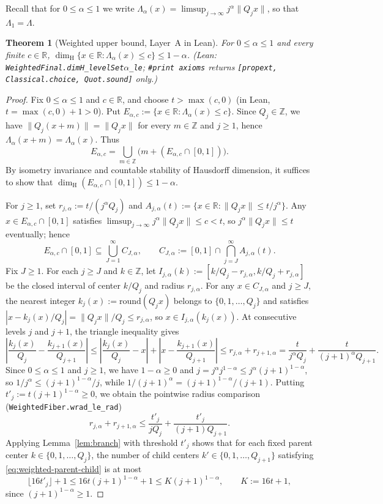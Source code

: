 \documentclass[11pt]{article}
\newtheorem{theorem}{Theorem}
\theoremstyle{definition}
\theoremstyle{remark}
\newcommand{\R}{\mathbb{R}}
\newcommand{\Z}{\mathbb{Z}}
\newcommand{\dimH}{\dim_{\mathrm{H}}}
\newcommand{\Lam}{\Lambda}
\begin{document}
Recall that for $0\le\alpha\le1$ we write
$\Lam_\alpha(x)=\limsup_{j\to\infty}j^\alpha\|Q_jx\|$, so that $\Lam_1=\Lam$.

\begin{theorem}[Weighted upper bound, Layer~A in Lean]\label{thm:upper}
For $0\le\alpha\le1$ and every finite $c\in\R$,
$\dimH\{x\in\R:\Lam_\alpha(x)\le c\}\le1-\alpha$.
(Lean: \texttt{WeightedFinal.\allowbreak dimH\_levelSet\ensuremath{\alpha}\_le};
\texttt{\#print axioms} returns \texttt{[propext, Classical.choice, Quot.sound]} only.)
\end{theorem}

\begin{proof}
Fix $0\le\alpha\le1$ and $c\in\R$, and choose $t>\max(c,0)$ (in Lean,
$t=\max(c,0)+1>0$). Put $E_{\alpha,c}:=\{x\in\R:\Lam_\alpha(x)\le c\}$. Since
$Q_j\in\Z$, we have $\|Q_j(x+m)\|=\|Q_jx\|$ for every $m\in\Z$ and $j\ge1$,
hence $\Lam_\alpha(x+m)=\Lam_\alpha(x)$. Thus
\[
E_{\alpha,c}=\bigcup_{m\in\Z}\bigl(m+(E_{\alpha,c}\cap[0,1])\bigr).
\]
By isometry invariance and countable stability of Hausdorff dimension, it
suffices to show that $\dimH(E_{\alpha,c}\cap[0,1])\le1-\alpha$.

For $j\ge1$, set $r_{j,\alpha}:=t/(j^\alpha Q_j)$ and
$A_{j,\alpha}(t):=\{x\in\R:\|Q_jx\|\le t/j^\alpha\}$. Any $x\in E_{\alpha,c}\cap[0,1]$
satisfies $\limsup_{j\to\infty}j^\alpha\|Q_jx\|\le c<t$, so $j^\alpha\|Q_jx\|\le t$
eventually; hence
\[
E_{\alpha,c}\cap[0,1]\subseteq\bigcup_{J=1}^\infty C_{J,\alpha},\qquad
C_{J,\alpha}:=[0,1]\cap\bigcap_{j=J}^\infty A_{j,\alpha}(t).
\]
Fix $J\ge1$. For each $j\ge J$ and $k\in\Z$, let
$I_{j,\alpha}(k):=[k/Q_j-r_{j,\alpha},k/Q_j+r_{j,\alpha}]$ be the closed
interval of center $k/Q_j$ and radius $r_{j,\alpha}$. For any $x\in C_{J,\alpha}$
and $j\ge J$, the nearest integer $k_j(x):=\mathrm{round}(Q_jx)$ belongs to
$\{0,1,\dots,Q_j\}$ and satisfies $|x-k_j(x)/Q_j|=\|Q_jx\|/Q_j\le r_{j,\alpha}$,
so $x\in I_{j,\alpha}(k_j(x))$. At consecutive levels $j$ and $j+1$, the
triangle inequality gives
\begin{equation}\label{eq:weighted-parent-child}
\left|\frac{k_j(x)}{Q_j}-\frac{k_{j+1}(x)}{Q_{j+1}}\right|
\le\left|\frac{k_j(x)}{Q_j}-x\right|+\left|x-\frac{k_{j+1}(x)}{Q_{j+1}}\right|
\le r_{j,\alpha}+r_{j+1,\alpha}=\frac{t}{j^\alpha Q_j}+\frac{t}{(j+1)^\alpha Q_{j+1}}.
\end{equation}
Since $0\le\alpha\le1$ and $j\ge1$, we have $1-\alpha\ge0$ and
$j=j^\alpha j^{1-\alpha}\le j^\alpha(j+1)^{1-\alpha}$, so
$1/j^\alpha\le(j+1)^{1-\alpha}/j$, while
$1/(j+1)^\alpha=(j+1)^{1-\alpha}/(j+1)$. Putting $t'_j:=t(j+1)^{1-\alpha}\ge0$,
we obtain the pointwise radius comparison (\texttt{WeightedFiber.wrad\_le\_rad})
\[
r_{j,\alpha}+r_{j+1,\alpha}
\le\frac{t'_j}{jQ_j}+\frac{t'_j}{(j+1)Q_{j+1}}.
\]
Applying Lemma~\ref{lem:branch} with threshold $t'_j$ shows that for each fixed
parent center $k\in\{0,1,\dots,Q_j\}$, the number of child centers
$k'\in\{0,1,\dots,Q_{j+1}\}$ satisfying \eqref{eq:weighted-parent-child} is at
most
\[
\lfloor16t'_j\rfloor+1\le 16t(j+1)^{1-\alpha}+1\le K(j+1)^{1-\alpha},
\qquad K:=16t+1,
\]
since $(j+1)^{1-\alpha}\ge1$.


\end{proof}
\end{document}
